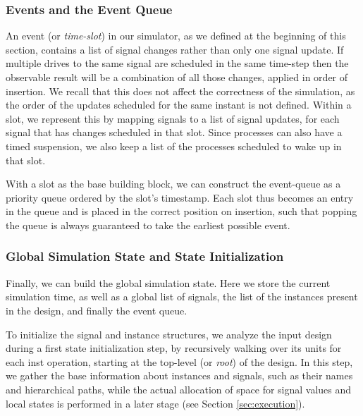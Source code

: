 
\subsubsection{Events and the Event Queue}
An event (or \textit{time-slot}) in our simulator, as we defined at the beginning of this section, contains a list of signal changes rather than only one signal update. If multiple drives to the same signal are scheduled in the same time-step then the observable result will be a combination of all those changes, applied in order of insertion. We recall that this does not affect the correctness of the simulation, as the order of the updates scheduled for the same instant is not defined. Within a slot, we represent this by mapping signals to a list of signal updates, for each signal that has changes scheduled in that slot. Since processes can also have a timed suspension, we also keep a list of the processes scheduled to wake up in that slot.

With a slot as the base building block, we can construct the event-queue as a priority queue ordered by the slot's timestamp. Each slot thus becomes an entry in the queue and is placed in the correct position on insertion, such that popping the queue is always guaranteed to take the earliest possible event.


\subsubsection{Global Simulation State and State Initialization}
\label{sec:state}
Finally, we can build the global simulation state. Here we store the current simulation time, as well as a global list of signals, the list of the instances present in the design, and finally the event queue.

To initialize the signal and instance structures, we analyze the input design during a first state initialization step, by recursively walking over its units for each inst operation, starting at the top-level (or \textit{root}) of the design. In this step, we gather the base information about instances and signals, such as their names and hierarchical paths, while the actual allocation of space for signal values and local states is performed in a later stage (see Section \ref{sec:execution}).


